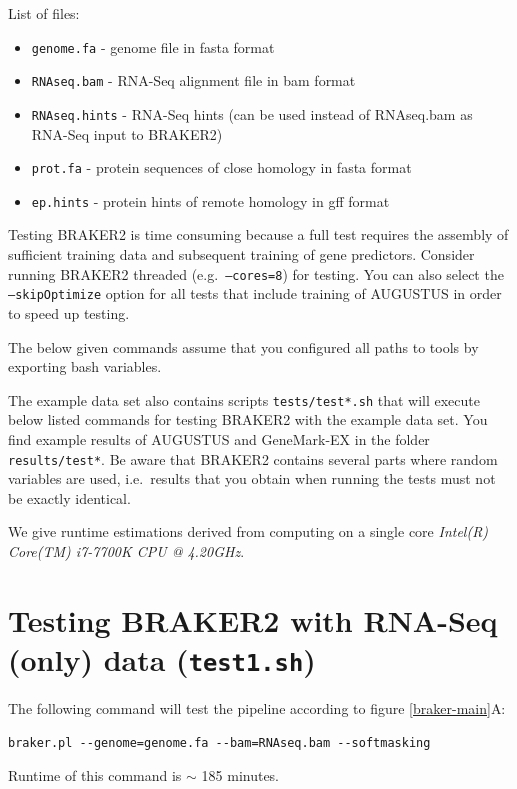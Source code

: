 \documentclass[a4paper,10pt]{report}
\begin{document}
List of files:

\begin{itemize}
 \item \texttt{genome.fa} - genome file in fasta format
 \item \texttt{RNAseq.bam} - RNA-Seq alignment file in bam format
 \item \texttt{RNAseq.hints} - RNA-Seq hints (can be used instead of RNAseq.bam as RNA-Seq input to BRAKER2)
 \item \texttt{prot.fa} - protein sequences of close homology in fasta format
 \item \texttt{ep.hints} - protein hints of remote homology in gff format
\end{itemize}


Testing BRAKER2 is time consuming because a full test requires the assembly of sufficient training data and subsequent training of gene predictors. Consider running BRAKER2 threaded (e.g.~\texttt{--cores=8}) for testing. You can also select the \texttt{--skipOptimize} option for all tests that include training of AUGUSTUS in order to speed up testing. 

The below given commands assume that you configured all paths to tools by exporting bash variables.

The example data set also contains scripts \texttt{tests/test*.sh} that will execute below listed commands for testing BRAKER2 with the example data set. You find example results of AUGUSTUS and GeneMark-EX in the folder \texttt{results/test*}. Be aware that BRAKER2 contains several parts where random variables are used, i.e.~results that you obtain when running the tests must not be exactly identical.

We give runtime estimations derived from computing on a single core \textit{Intel(R) Core(TM) i7-7700K CPU @ 4.20GHz}.

\section{Testing BRAKER2 with RNA-Seq (only) data (\texttt{test1.sh})}

The following command will test the pipeline according to figure \ref{braker-main}A:

\begin{verbatim}
braker.pl --genome=genome.fa --bam=RNAseq.bam --softmasking
\end{verbatim}

Runtime of this command is $\sim$ 185 minutes.
\end{document}
